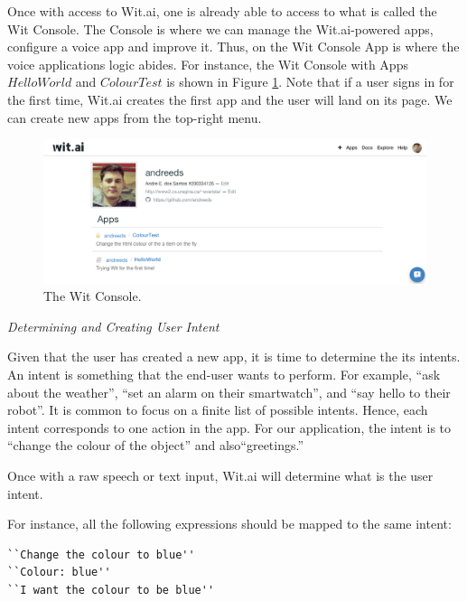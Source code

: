 Once with access to Wit.ai, one is already able to access to what is called the Wit Console. 
The Console is where we can manage the Wit.ai-powered apps, configure a voice app and improve it.
Thus, on the Wit Console App is where the voice applications logic abides.
For instance, the Wit Console with Apps $HelloWorld$ and $ColourTest$ is shown in Figure \ref{fig:console}.
Note that if a user signs in for the first time, Wit.ai creates the first app and the user will land on its page.
We can create new apps from the top-right menu.

\begin{figure}
\label{fig:console}
\centerline{
\includegraphics[width=\textwidth]{figures/Wit_Console.png}
}
\caption{The Wit Console.}
\end{figure}

\emph{Determining and Creating User Intent}

Given that the user has created a new app, it is time to determine the its intents.
An intent is something that the end-user wants to perform.
For example,
``ask about the weather'', 
``set an alarm on their smartwatch'', and 
``say hello to their robot''.
It is common to focus on a finite list of possible intents.
Hence, each intent corresponds to one action in the app.
For our application, the intent is to ``change the colour of the object'' and also``greetings.''

Once with a raw speech or text input, Wit.ai will determine what is the user intent.

For instance, all the following expressions should be mapped to the same intent:
\begin{lstlisting}[language=html]
``Change the colour to blue''
``Colour: blue''
``I want the colour to be blue''
\end{lstlisting}


